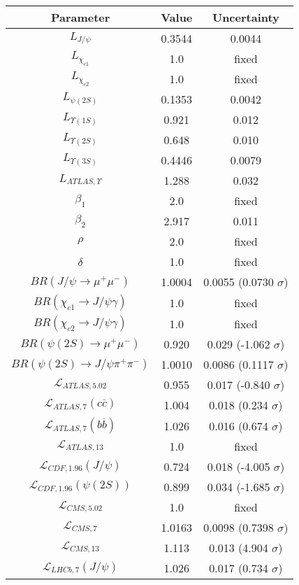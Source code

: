 \begin{table}[h!]
\centering
\begin{tabular}{c|c|c}
Parameter & Value & Uncertainty \\
\hline
$L_{J/\psi}$ & 0.3544 & 0.0044 \\
$L_{\chi_{c1}}$ & 1.0 & fixed \\
$L_{\chi_{c2}}$ & 1.0 & fixed \\
$L_{\psi(2S)}$ & 0.1353 & 0.0042 \\
$L_{\Upsilon(1S)}$ & 0.921 & 0.012 \\
$L_{\Upsilon(2S)}$ & 0.648 & 0.010 \\
$L_{\Upsilon(3S)}$ & 0.4446 & 0.0079 \\
$L_{ATLAS,\Upsilon}$ & 1.288 & 0.032 \\
$\beta_1$ & 2.0 & fixed \\
$\beta_2$ & 2.917 & 0.011 \\
$\rho$ & 2.0 & fixed \\
$\delta$ & 1.0 & fixed \\
$BR(J/\psi\rightarrow\mu^+\mu^-)$ & 1.0004 & 0.0055 (0.0730 $\sigma$) \\
$BR(\chi_{c1}\rightarrow J/\psi\gamma)$ & 1.0 & fixed \\
$BR(\chi_{c2}\rightarrow J/\psi\gamma)$ & 1.0 & fixed \\
$BR(\psi(2S)\rightarrow\mu^+\mu^-)$ & 0.920 & 0.029 (-1.062 $\sigma$) \\
$BR(\psi(2S)\rightarrow J/\psi\pi^+\pi^-)$ & 1.0010 & 0.0086 (0.1117 $\sigma$) \\
$\mathcal L_{ATLAS,5.02}$ & 0.955 & 0.017 (-0.840 $\sigma$) \\
$\mathcal L_{ATLAS,7}(c\overline c)$ & 1.004 & 0.018 (0.234 $\sigma$) \\
$\mathcal L_{ATLAS,7}(b\overline b)$ & 1.026 & 0.016 (0.674 $\sigma$) \\
$\mathcal L_{ATLAS,13}$ & 1.0 & fixed \\
$\mathcal L_{CDF,1.96}(J/\psi)$ & 0.724 & 0.018 (-4.005 $\sigma$) \\
$\mathcal L_{CDF,1.96}(\psi(2S))$ & 0.899 & 0.034 (-1.685 $\sigma$) \\
$\mathcal L_{CMS,5.02}$ & 1.0 & fixed \\
$\mathcal L_{CMS,7}$ & 1.0163 & 0.0098 (0.7398 $\sigma$) \\
$\mathcal L_{CMS,13}$ & 1.113 & 0.013 (4.904 $\sigma$) \\
$\mathcal L_{LHCb,7}(J/\psi)$ & 1.026 & 0.017 (0.734 $\sigma$) \\

\end{tabular}
\end{table}
